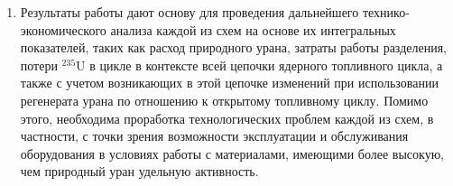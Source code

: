 \begin{enumerate}
\item Результаты работы дают основу для проведения дальнейшего технико-экономического анализа каждой из схем на основе их интегральных показателей, таких как расход природного урана, затраты работы разделения, потери $^{235}$U в цикле в контексте всей цепочки ядерного топливного цикла, а также с учетом возникающих в этой цепочке изменений при использовании регенерата урана по отношению к открытому топливному циклу. Помимо этого, необходима проработка технологических проблем каждой из схем, в частности, с точки зрения возможности эксплуатации и обслуживания оборудования в условиях работы с материалами, имеющими более высокую, чем природный уран удельную активность. 
\end{enumerate}
